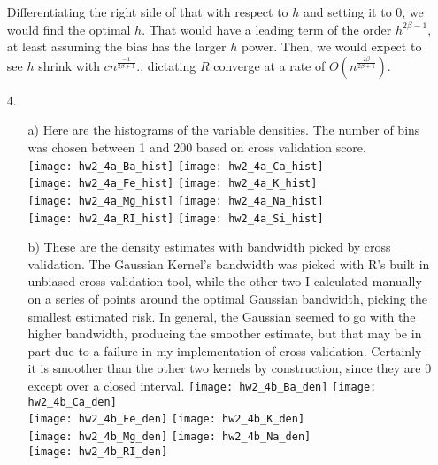 \documentclass[11pt]{article}
\theoremstyle{definition}
\begin{document}
\begin{itemize}
        Differentiating the right side of that with respect to $h$ and setting it to $0$, we would find the optimal $h$. That would have a leading term of the order $h^{2\beta-1}$, at least assuming the bias has the larger $h$ power. Then, we would expect to see $h$ shrink with $cn^\frac{-1}{2\beta+1}$., dictating $R$ converge at a rate of $O(n^\frac{2\beta}{2\beta+1})$. 
    \item[4.]
        \begin{itemize}
            \item[a)]
                Here are the histograms of the variable densities. The number of bins was chosen between 1 and 200 based on cross validation score.\\
                \texttt{[image: hw2\_4a\_Ba\_hist]}
                \texttt{[image: hw2\_4a\_Ca\_hist]} \\ 
                \texttt{[image: hw2\_4a\_Fe\_hist]} 
                \texttt{[image: hw2\_4a\_K\_hist]}   \\
                \texttt{[image: hw2\_4a\_Mg\_hist]}
                \texttt{[image: hw2\_4a\_Na\_hist]}  \\
                \texttt{[image: hw2\_4a\_RI\_hist]} 
                \texttt{[image: hw2\_4a\_Si\_hist]}  \\
            \item[b)]
                These are the density estimates with bandwidth picked by cross validation. The Gaussian Kernel's bandwidth was picked with R's built in unbiased cross validation tool, while the other two I calculated manually on a series of points around the optimal Gaussian bandwidth, picking the smallest estimated risk. In general, the Gaussian seemed to go with the higher bandwidth, producing the smoother estimate, but that may be in part due to a failure in my implementation of cross validation. Certainly it is smoother than the other two kernels by construction, since they are $0$ except over a closed interval. 
                \texttt{[image: hw2\_4b\_Ba\_den]}
                \texttt{[image: hw2\_4b\_Ca\_den]} \\ 
                \texttt{[image: hw2\_4b\_Fe\_den]} 
                \texttt{[image: hw2\_4b\_K\_den]}   \\
                \texttt{[image: hw2\_4b\_Mg\_den]}
                \texttt{[image: hw2\_4b\_Na\_den]}  \\
                \texttt{[image: hw2\_4b\_RI\_den]} 

\end{itemize}
\end{itemize}
\end{document}
